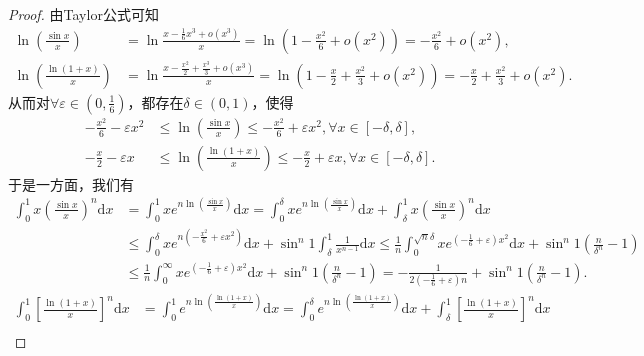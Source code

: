 \documentclass[../../main.tex]{subfiles}%
\begin{document}
\begin{proof}

由Taylor公式可知
\begin{align*}
\ln \left( \frac{\sin x}{x} \right) &=\ln \frac{x-\frac{1}{6}x^3+o\left( x^3 \right)}{x}=\ln \left( 1-\frac{x^2}{6}+o\left( x^2 \right) \right) =-\frac{x^2}{6}+o\left( x^2 \right) ,\\
\ln \left( \frac{\ln \left( 1+x \right)}{x} \right) &=\ln \frac{x-\frac{x^2}{2}+\frac{x^3}{3}+o\left( x^3 \right)}{x}=\ln \left( 1-\frac{x}{2}+\frac{x^2}{3}+o\left( x^2 \right) \right) =-\frac{x}{2}+\frac{x^2}{3}+o\left( x^2 \right) .
\end{align*}
从而对$\forall \varepsilon \in \left( 0,\frac{1}{6} \right)$，都存在$\delta \in (0,1)$，使得
\begin{align*}
-\frac{x^2}{6}-\varepsilon x^2&\leqslant \ln \left( \frac{\sin x}{x} \right) \leqslant -\frac{x^2}{6}+\varepsilon x^2,\forall x\in [-\delta ,\delta ] ,\\
-\frac{x}{2}-\varepsilon x&\leqslant \ln \left( \frac{\ln \left( 1+x \right)}{x} \right) \leqslant -\frac{x}{2}+\varepsilon x,\forall x\in [-\delta ,\delta ] .
\end{align*}
于是一方面，我们有
\begin{align*}
\int_0^1{x\left( \frac{\sin x}{x} \right) ^n\mathrm{d}x}&=\int_0^1{xe^{n\ln \left( \frac{\sin x}{x} \right)}\mathrm{d}x}=\int_0^{\delta}{xe^{n\ln \left( \frac{\sin x}{x} \right)}\mathrm{d}x}+\int_{\delta}^1{x\left( \frac{\sin x}{x} \right) ^n\mathrm{d}x}\\
&\leqslant \int_0^{\delta}{xe^{n\left( -\frac{x^2}{6}+\varepsilon x^2 \right)}\mathrm{d}x}+\sin ^n1\int_{\delta}^1{\frac{1}{x^{n-1}}\mathrm{d}x}\leqslant \frac{1}{n}\int_0^{\sqrt{n}\delta}{xe^{\left( -\frac{1}{6}+\varepsilon \right) x^2}\mathrm{d}x}+\sin ^n1\left( \frac{n}{\delta ^n}-1 \right)\\
&\leqslant \frac{1}{n}\int_0^{\infty}{xe^{\left( -\frac{1}{6}+\varepsilon \right) x^2}\mathrm{d}x}+\sin ^n1\left( \frac{n}{\delta ^n}-1 \right) =-\frac{1}{2\left( -\frac{1}{6}+\varepsilon \right) n}+\sin ^n1\left( \frac{n}{\delta ^n}-1 \right) .
\end{align*}
\begin{align*}
\int_0^1{\left[ \frac{\ln \left( 1+x \right)}{x} \right] ^n\mathrm{d}x}&=\int_0^1{e^{n\ln \left( \frac{\ln \left( 1+x \right)}{x} \right)}\mathrm{d}x}=\int_0^{\delta}{e^{n\ln \left( \frac{\ln \left( 1+x \right)}{x} \right)}\mathrm{d}x}+\int_{\delta}^1{\left[ \frac{\ln \left( 1+x \right)}{x} \right] ^n\mathrm{d}x}\\

\end{align*}
\end{proof}
\end{document}
